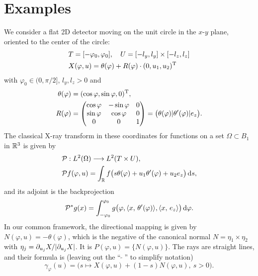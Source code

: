\documentclass{amsart}
\renewcommand*{\phi}{\varphi}
\begin{document}
\section{Examples}



\begin{example}
 We consider a flat 2D detector moving on the unit circle in the $x$-$y$ plane, oriented to the center of the circle:
 \begin{align*}
  & T = [-\phi_0, \phi_0],\quad U = [-l_y, l_y] \times [-l_z, l_z] \\
  & X(\phi, u) = \theta(\phi) + R(\phi) \cdot \TRANSP{(0, u_1, u_2)}
 \end{align*}
 with $\phi_0 \in (0, \pi/2]$, $l_y, l_z > 0$ and
 \begin{align}
  \theta(\phi) &= \TRANSP{(\cos\phi, \sin\phi, 0)}, \\ 
  R(\phi) &=
  \begin{pmatrix}
   \cos\phi & -\sin\phi & 0 \\
   \sin\phi & \cos\phi & 0 \\
   0 & 0 & 1
  \end{pmatrix}
  = \big(\theta(\phi) | \theta'(\phi) | e_z\big).
 \end{align}
 The classical X-ray transform in these coordinates for functions on a set $\Omega \subset B_1$ in ${\mathbb{R}}^3$ is given by
 \begin{align}
  &\OPP: L^2(\Omega) \Lto L^2(T \times U), \notag \\
  \label{eq:parallel_fwdproj}
  &\OPP f(\phi, u) = \int_\RR f\big(s\theta(\phi) + u_1 \theta'(\phi) + u_2 e_z\big)\, \D s,
 \end{align}
 and its adjoint is the backprojection
 \begin{equation}
  \label{eq:parallel_backproj}
  \DUALOPP g(x) = \int_{-\phi_0}^{\phi_0} g\big(\phi, \INNER{x}{\theta'(\phi)}, \INNER{x}{e_z}\big)\, \D \phi.
 \end{equation}
 In our common framework, the directional mapping is given by $N(\phi, u) = -\theta(\phi)$, which is the negative of the canonical normal 
 $N = \eta_1 \times \eta_2$ with $\eta_j = \partial_{u_j} X / |\partial_{u_j} X|$. It is $P(\phi, u) = \lbrace N(\phi, u)\rbrace$.
 The rays are straight lines, and their formula is (leaving out the ``$\,\widetilde{\ }\,$'' to simplify notation)
 \begin{equation*}
  \gamma_\phi(u) = \big( s \mapsto X(\phi, u) + (1-s) N(\phi, u),\ s > 0 \big).

\end{equation*}
\end{example}
\end{document}
